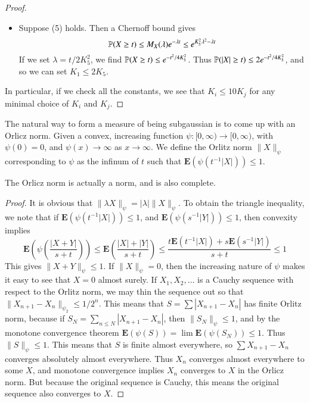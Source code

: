 \begin{proof}
\begin{itemize}
    \item Suppose (5) holds. Then a Chernoff bound gives
    \[ \operatorname{\mathbb{P}}(X \geq t) \leq M_X(\lambda) e^{-\lambda t} \leq e^{K_5^2 \lambda^2 - \lambda t} \]
    If we set $\lambda = t/2K_5^2$, we find $\operatorname{\mathbb{P}}(X \geq t) \leq e^{-t^2/4K_5^2}$. Thus $\operatorname{\mathbb{P}}(|X| \geq t) \leq 2 e^{-t^2/4K_5^2}$, and so we can set $K_1 \leq 2K_5$.
\end{itemize}
%
In particular, if we check all the constants, we see that $K_i \leq 10K_j$ for any minimal choice of $K_i$ and $K_j$.
\end{proof}

The natural way to form a measure of being subgaussian is to come up with an Orlicz norm. Given a convex, increasing function $\psi:[0,\infty) \to [0,\infty)$, with $\psi(0) = 0$, and $\psi(x) \to \infty$ as $x \to \infty$. We define the Orlitz norm $\| X \|_\psi$ corresponding to $\psi$ as the infinum of $t$ such that $\mathbf{E}(\psi(t^{-1} |X|)) \leq 1$.

\begin{theorem}
    The Orlicz norm is actually a norm, and is also complete.
\end{theorem}
\begin{proof}
    It is obvious that $\| \lambda X \|_\psi = |\lambda| \| X \|_\psi$. To obtain the triangle inequality, we note that if $\mathbf{E}(\psi(t^{-1} |X|)) \leq 1$, and $\mathbf{E}(\psi(s^{-1} |Y|)) \leq 1$, then convexity implies
    \[ \mathbf{E} \left(\psi \left(\frac{|X + Y|}{s + t} \right) \right) \leq \mathbf{E} \left( \frac{|X| + |Y|}{s + t} \right) \leq \frac{t \mathbf{E}(t^{-1} |X|) + s \mathbf{E}(s^{-1} |Y|)}{s + t} \leq 1 \]
    This gives $\| X + Y \|_\psi \leq 1$. If $\| X \|_\psi = 0$, then the increasing nature of $\psi$ makes it easy to see that $X = 0$ almost surely. If $X_1, X_2, \dots$ is a Cauchy sequence with respect to the Orlitz norm, we may thin the sequence out so that $\| X_{n+1} - X_n \|_{\psi_2} \leq 1/2^n$. This means that $S = \sum |X_{n+1} - X_n|$ has finite Orlitz norm, because if $S_N = \sum_{n \leq N} |X_{n+1} - X_n|$, then $\| S_N \|_\psi \leq 1$, and by the monotone convergence theorem $\mathbf{E}(\psi(S)) = \lim \mathbf{E}(\psi(S_N)) \leq 1$. Thus $\| S \|_\psi \leq 1$. This means that $S$ is finite almost everywhere, so $\sum X_{n+1} - X_n$ converges absolutely almost everywhere. Thus $X_n$ converges almost everywhere to some $X$, and monotone convergence implies $X_n$ converges to $X$ in the Orlicz norm. But because the original sequence is Cauchy, this means the original sequence also converges to $X$.
\end{proof}

